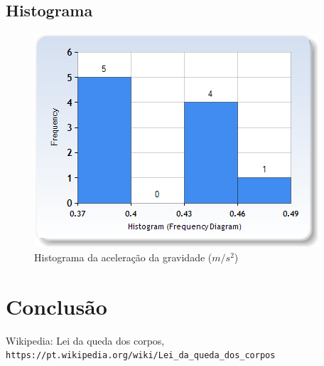 \documentclass[a4paper]{article}
\begin{document}
    \subsection{Histograma}
        \begin{figure}[h!]
          \includegraphics[width=\linewidth]{img/histograma.png}
          \caption{Histograma da aceleração da gravidade ($ m/s^2 $)}
          \label{fig:histograma}
        \end{figure}

\section{Conclusão}


\begin{thebibliography}{1}

    Wikipedia: Lei da queda dos corpos,
    \\\texttt{https://pt.wikipedia.org/wiki/Lei\_da\_queda\_dos\_corpos}
\end{thebibliography}
\end{document}
